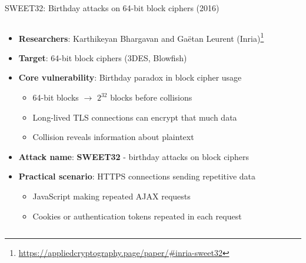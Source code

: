 \documentclass[aspectratio=169, lualatex, handout]{beamer}
\begin{document}
\begin{frame}{SWEET32: Birthday attacks on 64-bit block ciphers (2016)}
	\begin{columns}[c]
		\begin{column}{1\textwidth}
			\begin{itemize}[<+->]
				\item \textbf{Researchers}: Karthikeyan Bhargavan and Gaëtan Leurent (Inria)\footnote{\url{https://appliedcryptography.page/paper/\#inria-sweet32}}
				\item \textbf{Target}: 64-bit block ciphers (3DES, Blowfish)
				\item \textbf{Core vulnerability}: Birthday paradox in block cipher usage
				      \begin{itemize}
					      \item 64-bit blocks $\rightarrow$ $2^{32}$ blocks before collisions
					      \item Long-lived TLS connections can encrypt that much data
					      \item Collision reveals information about plaintext
				      \end{itemize}
				\item \textbf{Attack name}: \textbf{SWEET32} - birthday attacks on block ciphers
				\item \textbf{Practical scenario}: HTTPS connections sending repetitive data
				      \begin{itemize}
					      \item JavaScript making repeated AJAX requests
					      \item Cookies or authentication tokens repeated in each request
				      \end{itemize}
			\end{itemize}
		\end{column}
	\end{columns}
\end{frame}
\end{document}
